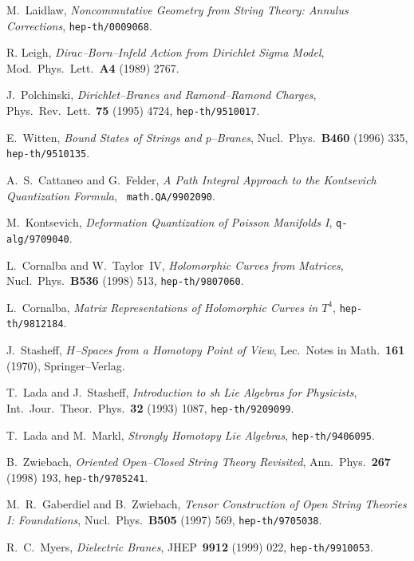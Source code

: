 \documentclass[a4paper,11pt]{article}
\begin{document}
\begin{thebibliography}{99}
{  {\small M.~Laidlaw, \textit{Noncommutative Geometry from
String Theory: Annulus Corrections}, \texttt{hep-th/0009068}. }

  {\small R. Leigh, \textit{Dirac--Born--Infeld Action from
Dirichlet Sigma Model}, Mod.\ Phys.\ Lett.\ \textbf{A4} (1989) 2767. }

  {\small J.~Polchinski, \textit{Dirichlet--Branes and
Ramond--Ramond Charges}, Phys.\ Rev.\ Lett.\ \textbf{75} (1995) 4724, 
\texttt{hep-th/9510017}. }

  {\small E.~Witten, \textit{Bound States of Strings and 
$p$--Branes}, Nucl.\ Phys.\ \textbf{B460} (1996) 335, \texttt{hep-th/9510135}.
}

  {\small A.~S.~Cattaneo and G.~Felder, \textit{A
Path Integral Approach to the Kontsevich Quantization Formula}, \texttt{
math.QA/9902090}. }

  {\small M.~Kontsevich, \textit{Deformation
Quantization of Poisson Manifolds I}, \texttt{q-alg/9709040}. }

  {\small L.~Cornalba and W.~Taylor~IV, \textit{
Holomorphic Curves from Matrices}, Nucl.\ Phys.\ \textbf{B536} (1998) 513, 
\texttt{hep-th/9807060}. }

  {\small L.~Cornalba, \textit{Matrix Representations of
Holomorphic Curves in $T^4$}, \texttt{hep-th/9812184}. }

 {\small J.~Stasheff, \textit{$H$--Spaces from a 
Homotopy Point of View}, Lec.\ Notes in Math.\ \textbf{161} (1970), 
Springer--Verlag. }

  {\small T.~Lada and J.~Stasheff, \textit{
Introduction to sh Lie Algebras for Physicists}, Int.\ Jour.\ Theor.\ Phys.\ 
\textbf{32} (1993) 1087, \texttt{hep-th/9209099}. }

  {\small T.~Lada and M.~Markl, \textit{Strongly Homotopy
Lie Algebras}, \texttt{hep-th/9406095}. }

  {\small B.~Zwiebach, \textit{Oriented Open--Closed 
String Theory Revisited}, Ann.\ Phys.\ \textbf{267} (1998) 193, 
\texttt{hep-th/9705241}. }

  {\small M.~R.~Gaberdiel and B.~Zwiebach, \textit{Tensor
Construction of Open String Theories I: Foundations}, Nucl.\ Phys.\
\textbf{B505} (1997) 569, \texttt{hep-th/9705038}. }

  {\small R.~C.~Myers, \textit{Dielectric Branes}, JHEP\ 
\textbf{9912} (1999) 022, \texttt{hep-th/9910053}. }

}
\end{thebibliography}
\end{document}
